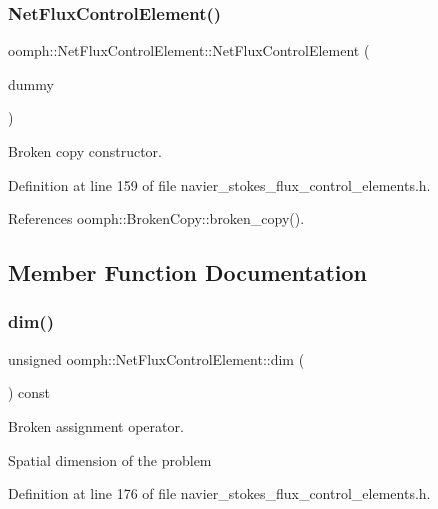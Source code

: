 \subsubsection{\texorpdfstring{Net\+Flux\+Control\+Element()}{NetFluxControlElement()}\hspace{0.1cm}{\footnotesize\ttfamily [2/2]}}
{\footnotesize\ttfamily oomph\+::\+Net\+Flux\+Control\+Element\+::\+Net\+Flux\+Control\+Element (\begin{DoxyParamCaption}\item[{const \hyperlink{classoomph_1_1NetFluxControlElement}{Net\+Flux\+Control\+Element} \&}]{dummy }\end{DoxyParamCaption})\hspace{0.3cm}{\ttfamily [inline]}}



Broken copy constructor. 



Definition at line 159 of file navier\+\_\+stokes\+\_\+flux\+\_\+control\+\_\+elements.\+h.



References oomph\+::\+Broken\+Copy\+::broken\+\_\+copy().



\subsection{Member Function Documentation}
\mbox{\label{classoomph_1_1NetFluxControlElement_ada42257a8f26546b44182fe463f200bf}} 
\subsubsection{\texorpdfstring{dim()}{dim()}}
{\footnotesize\ttfamily unsigned oomph\+::\+Net\+Flux\+Control\+Element\+::dim (\begin{DoxyParamCaption}{ }\end{DoxyParamCaption}) const\hspace{0.3cm}{\ttfamily [inline]}}



Broken assignment operator. 

Spatial dimension of the problem 

Definition at line 176 of file navier\+\_\+stokes\+\_\+flux\+\_\+control\+\_\+elements.\+h.



